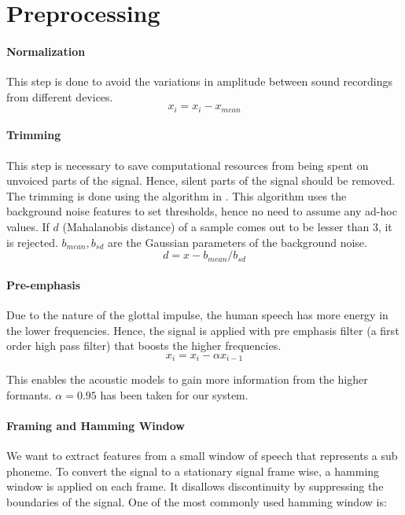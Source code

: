\appendix

\chapter{Preprocessing}
\subsubsection{Normalization}
This step is done to avoid the variations in amplitude between sound recordings from different devices.
\begin{equation*} x_i = x_i - x_{mean} \end{equation*}

\subsubsection{Trimming}
This step is necessary to save computational resources from being spent on unvoiced parts of the signal. Hence, silent parts of the signal should be removed. The trimming is done using the algorithm in \cite{Saha_anew}. This algorithm uses the background noise features to set thresholds, hence no need to assume any ad-hoc values. If $d$ (Mahalanobis distance) of a sample comes out to be lesser than 3, it is rejected. $b_{mean}, b_{sd}$ are the Gaussian parameters of the background noise.
\begin{equation*} d = x - b_{mean} / b_{sd} \end{equation*}

\newpage

\subsubsection{Pre-emphasis}
Due to the nature of the glottal impulse, the human speech has more energy in the lower frequencies. Hence, the signal is applied with pre emphasis filter (a first order high pass filter) that boosts the higher frequencies.
\begin{equation*} x_i = x_i - \alpha x_{i-1} \end{equation*}

This enables the acoustic models to gain more information from the higher formants. $\alpha = 0.95$ has been taken for our system. 

\subsubsection{Framing and Hamming Window}
We want to extract features from a small window of speech that represents a sub phoneme. To convert the signal to a stationary signal frame wise, a hamming window is applied on each frame. It disallows discontinuity by suppressing the boundaries of the signal. One of the most commonly used hamming window is:

